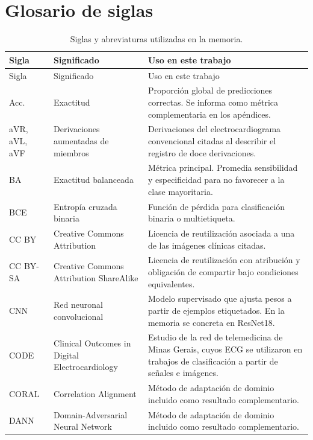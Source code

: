 \chapter*{Glosario de siglas}



{\small
\begin{longtable}{@{}>{\raggedright\arraybackslash}p{2.20cm}>{\raggedright\arraybackslash}p{4.10cm}>{\raggedright\arraybackslash}p{7.95cm}@{}}
\caption{Siglas y abreviaturas utilizadas en la memoria.}
\label{tab:glosario_siglas}\\
\toprule
Sigla & Significado & Uso en este trabajo \\
\midrule
\endfirsthead
\toprule
Sigla & Significado & Uso en este trabajo \\
\midrule
\endhead
\bottomrule
\endfoot
Acc. & Exactitud & Proporción global de predicciones correctas. Se informa como métrica complementaria en los apéndices. \\
aVR, aVL, aVF & Derivaciones aumentadas de miembros & Derivaciones del electrocardiograma convencional citadas al describir el registro de doce derivaciones. \\
BA & Exactitud balanceada & Métrica principal. Promedia sensibilidad y especificidad para no favorecer a la clase mayoritaria. \\
BCE & Entropía cruzada binaria & Función de pérdida para clasificación binaria o multietiqueta. \\
CC BY & Creative Commons Attribution & Licencia de reutilización asociada a una de las imágenes clínicas citadas. \\
CC BY-SA & Creative Commons Attribution ShareAlike & Licencia de reutilización con atribución y obligación de compartir bajo condiciones equivalentes. \\
CNN & Red neuronal convolucional & Modelo supervisado que ajusta pesos a partir de ejemplos etiquetados. En la memoria se concreta en ResNet18. \\
CODE & Clinical Outcomes in Digital Electrocardiology & Estudio de la red de telemedicina de Minas Gerais, cuyos ECG se utilizaron en trabajos de clasificación a partir de señales e imágenes. \\
CORAL & Correlation Alignment & Método de adaptación de dominio incluido como resultado complementario. \\
DANN & Domain-Adversarial Neural Network & Método de adaptación de dominio incluido como resultado complementario. \\

\end{longtable}}
